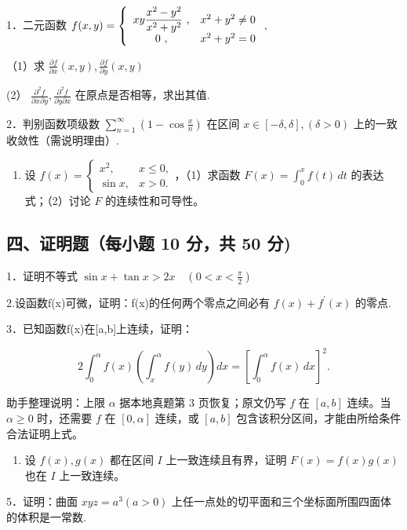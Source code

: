 \documentclass[11pt,fontset=fandol]{ctexart}
\providecommand{\tightlist}{\setlength{\itemsep}{0pt}\setlength{\parskip}{0pt}}
\begin{document}
1．二元函数
\(f ( x , y ) = \left\{ \begin{array} { c c } { { x y \displaystyle \frac { x ^ { 2 } - y ^ { 2 } } { x ^ { 2 } + y ^ { 2 } } ~ , } } & { { x ^ { 2 } + y ^ { 2 } \ne 0 } } \\ { { 0 ~ , } } & { { x ^ { 2 } + y ^ { 2 } = 0 } } \end{array} \right. ,\)

（1）求
\({ \frac { \partial f } { \partial x } } ( x , y ) , { \frac { \partial f } { \partial y } } ( x , y )\)

(2）
\(\frac { \partial ^ { 2 } f } { \partial x \partial y } , \frac { \partial ^ { 2 } f } { \partial y \partial x }\)
在原点是否相等，求出其值.

2．判别函数项级数
\(\sum _ { n = 1 } ^ { \infty } \left( 1 - \cos { \frac { x } { n } } \right)\)
在区间 \(x \in \left[ - \delta , \delta \right] , ( \delta > 0 )\)
上的一致收敛性（需说明理由）.

\begin{enumerate}
\def\labelenumi{\arabic{enumi}.}
\setcounter{enumi}{2}
\tightlist
\item
  设
  \(f(x)=\begin{cases}x^2,&x\leq0,\\\sin x,&x>0.\end{cases}\)，（1）求函数
  \(F(x)=\int_0^xf(t)\,dt\) 的表达式；（2）讨论 \(F\) 的连续性和可导性。
\end{enumerate}

\subsection{四、证明题（每小题 10 分，共 50
分)}\label{ux56dbux8bc1ux660eux9898ux6bcfux5c0fux9898-10-ux5206ux5171-50-ux5206}

1．证明不等式
\(\sin x + \tan x > 2 x \quad \left( 0 < x < { \frac { \pi } { 2 } } \right)\)

2.设函数f(x)可微，证明：f(x)的任何两个零点之间必有
\(f ( x ) + f ^ { \prime } \left( x \right)\) 的零点.

3．已知函数f(x)在{[}a,b{]}上连续，证明：

\[
2\int_0^\alpha f(x)\left(\int_x^\alpha f(y)\,dy\right)dx=\left[\int_0^\alpha f(x)\,dx\right]^2.
\]

助手整理说明：上限 \(\alpha\) 据本地真题第 3 页恢复；原文仍写 \(f\) 在
\([a,b]\) 连续。当 \(\alpha\geq0\) 时，还需要 \(f\) 在 \([0,\alpha]\)
连续，或 \([a,b]\) 包含该积分区间，才能由所给条件合法证明上式。

\begin{enumerate}
\def\labelenumi{\arabic{enumi}.}
\setcounter{enumi}{3}
\tightlist
\item
  设 \(f(x),g(x)\) 都在区间 \(I\) 上一致连续且有界，证明
  \(F(x)=f(x)g(x)\) 也在 \(I\) 上一致连续。
\end{enumerate}

5．证明：曲面 \(x y z = a ^ { 3 } \left( a > 0 \right)\)
上任一点处的切平面和三个坐标面所围四面体的体积是一常数.
\end{document}
